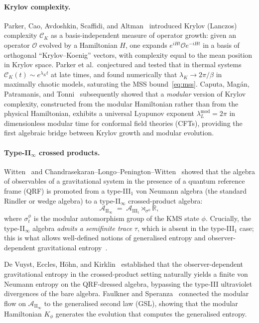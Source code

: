 \documentclass[12pt,a4paper]{article}
\begin{document}
\paragraph{Krylov complexity.}
Parker, Cao, Avdoshkin, Scaffidi, and Altman~\cite{Parker2019}
introduced Krylov (Lanczos) complexity $\mathcal{C}_K$ as a
basis-independent measure of operator growth: given an operator
$\mathcal{O}$ evolved by a Hamiltonian $H$, one expands
$e^{iHt}\mathcal{O}e^{-iHt}$ in a basis of orthogonal
``Krylov--Koenig'' vectors, with complexity equal to the mean
position in Krylov space.
Parker et al.\ conjectured and tested that in thermal systems
$\mathcal{C}_K(t) \sim e^{\lambda_K t}$ at late times, and found
numerically that $\lambda_K \to 2\pi/\beta$ in maximally chaotic
models, saturating the MSS bound~\eqref{eq:mss}.
Caputa, Mag\'{a}n, Patramanis, and Tonni~\cite{Caputa2024} subsequently
showed that a \emph{modular} version of Krylov complexity, constructed
from the modular Hamiltonian rather than from the physical Hamiltonian,
exhibits a universal Lyapunov exponent $\lambda_L^{\mathrm{mod}} = 2\pi$
in dimensionless modular time for conformal field theories (CFTs),
providing the first algebraic bridge between Krylov growth and
modular evolution.

\paragraph{Type-II$_\infty$ crossed products.}
Witten~\cite{Witten2022} and Chandrasekaran--Longo--Penington--Witten~\cite{CLPW2023}
showed that the algebra of observables of a gravitational system in the
presence of a quantum reference frame (QRF) is promoted from a
type-III$_1$ von Neumann algebra (the standard Rindler or wedge algebra)
to a type-II$_\infty$ crossed-product algebra:
\begin{equation}
  \mathcal{A}_{\mathrm{II}_\infty}
  \;=\; \mathcal{A}_{\mathrm{III}_1} \rtimes_{\sigma^\phi} \mathbb{R},
  \label{eq:crossed}
\end{equation}
where $\sigma^\phi_t$ is the modular automorphism group of the KMS
state $\phi$.
Crucially, the type-II$_\infty$ algebra \emph{admits a semifinite
trace} $\tau$, which is absent in the type-III$_1$ case; this is what
allows well-defined notions of generalised entropy and observer-dependent
gravitational entropy~\cite{DEHK2025a,DEHK2025b}.

De Vuyst, Eccles, H\"{o}hn, and Kirklin~\cite{DEHK2025a} established that
the observer-dependent gravitational entropy in the crossed-product
setting naturally yields a finite von Neumann entropy on the
QRF-dressed algebra, bypassing the type-III ultraviolet divergences of
the bare algebra.
Faulkner and Speranza~\cite{FaulknerSperanza2024} connected the modular
flow on $\mathcal{A}_{\mathrm{II}_\infty}$ to the generalised second law
(GSL), showing that the modular Hamiltonian $K_\phi$ generates the
evolution that computes the generalised entropy.
\end{document}
